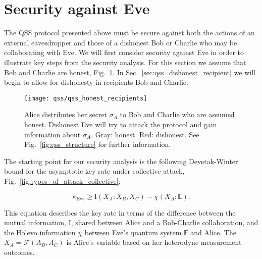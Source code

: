 \section{Security against Eve}\label{sec:qss_honest_recipients}

The QSS protocol presented above must be secure against both the actions of an external eavesdropper and those of a dishonest Bob or Charlie who may be collaborating with Eve. We will first consider security against Eve in order to illustrate key steps from the security analysis. For this section we assume that Bob and Charlie are honest,
Fig.~\ref{fig:qss_honest_recipients}. In Sec.~\ref{sec:qss_dishonest_recipient} we will begin to allow for dishonesty in recipients Bob and Charlie.

\begin{figure}[htp]
\captionsetup{width=0.8\linewidth}
\centering
\texttt{[image: qss/qss\_honest\_recipients]}
\caption{\label{fig:qss_honest_recipients} Alice distributes her secret $\sigma_A$ to Bob and Charlie who are assumed honest. Dishonest Eve will try to attack the protocol and gain information about $\sigma_A$. Gray: honest. Red: dishonest. See Fig.~\ref{fig:qss_structure} for further information.}
\end{figure}


The starting point for our security analysis is the following Devetak-Winter bound \cite{Devetak2004} for the asymptotic key rate under collective attack, Fig.~\ref{fig:types_of_attack_collective}:


\begin{equation}\label{eqn:qss_dw_eve}
\kappa_{\text{Eve}} \ge \text{I}\left(X_A : X_B, X_C\right) - \chi\left(X_A : \mathbb{E}\right).
\end{equation}

\noindent This equation describes the key rate in terms of the difference between the mutual information, $\text{I}$, shared between Alice and a Bob-Charlie collaboration, and the Holevo information $\chi$ between Eve's quantum system $\mathbb{E}$ and Alice. %
The $X_A = \mathcal{F}\left(A_B, A_C\right)$ is Alice's variable based on her heterodyne measurement outcomes.

